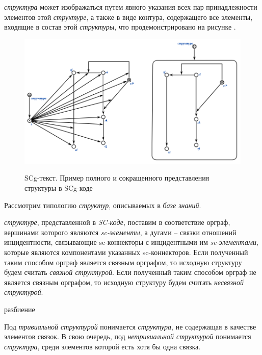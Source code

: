 \textit{структура} может изображаться путем явного указания всех пар принадлежности элементов этой \textit{структуре}, а также в виде контура, содержащего все элементы, входящие в состав этой \textit{структуры}, что продемонстрировано на рисунке \textit{}.

\begin{figure}[H]
	\caption{SCg-текст. Пример полного и сокращенного представления структуры в SCg-коде}
	\includegraphics[scale=0.7]{author/part2/figures/chapter_kb/structure.png}
	\label{fig:structure_example}
\end{figure}


Рассмотрим типологию \textit{структур}, описываемых в \textit{базе знаний}.

\textit{структуре}, представленной в \textit{SC-коде}, поставим в соответствие орграф, вершинами которого являются \textit{sc-элементы}, а дугами – связки отношений инцидентности, связывающие sc-коннекторы с инцидентными им \textit{sc-элементами}, которые являются компонентами указанных sc-коннекторов. Если полученный таким способом орграф является связным орграфом, то исходную структуру будем считать \textit{связной структурой}. Если полученный таким способом орграф не является связным орграфом, то исходную структуру будем считать \textit{несвязной структурой}.

\begin{SCn}
	\begin{scnrelfromset}{разбиение}
	\end{scnrelfromset}
\end{SCn}

Под \textit{тривиальной структурой} понимается \textit{структура}, не содержащая в качестве элементов связок. В свою очередь, под \textit{нетривиальной структурой} понимается \textit{структура}, среди элементов которой есть хотя бы одна связка.

